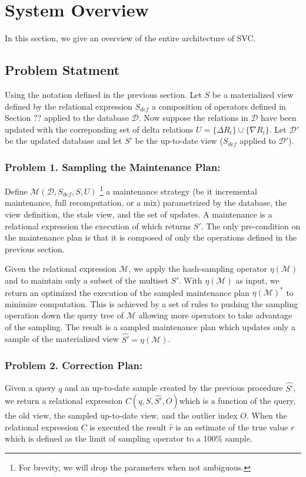 \section{System Overview}\label{sec-arch}
In this section, we give an overview of the entire architecture of SVC.

\subsection{Problem Statment}
Using the notation defined in the previous section. 
Let $S$ be a materialized view defined by the relational expression $S_{def}$ a composition of operators defined in Section ?? applied to the database $\mathcal{D}$.
Now suppose the relations in $\mathcal{D}$ have been updated with the correponding set of delta relations $U = \{\Delta R_i\} \cup \{\nabla R_i\}$.
Let $\mathcal{D}'$ be the updated database and let $S'$ be the up-to-date view ($S_{def}$ applied to $\mathcal{D}'$).

\subsubsection{Problem 1. Sampling the Maintenance Plan: }
Define $\mathcal{M}(\mathcal{D},S_{def},S,U)$ \footnote{For brevity, we will drop the parameters when not ambiguous.} a maintenance strategy (be it incremental maintenance, full recomputation, or a mix) parametrized by the database, the view definition, the stale view, and the set of updates.
A maintenance is a relational expression the execution of which returns $S'$.
The only pre-condition on the maintenance plan is that it is composed of only the operations defined in the previous section. 

Given the relational expression $\mathcal{M}$, we apply the hash-sampling operator $\eta(\mathcal{M})$ and to maintain only a subset of the multiset $S'$.
With $\eta(\mathcal{M})$ as input, we return an optimized the execution of the sampled maintenance plan $\eta(\mathcal{M})^*$ to minimize computation.
This is achieved by a set of rules to pushing the sampling operation down the query tree of $\mathcal{M}$ allowing more operators to take advantage of the sampling. 
The result is a sampled maintenance plan which updates only a sample of the materialized view $\hat{S'} = \eta(\mathcal{M})$.

\subsubsection{Problem 2. Correction Plan: }
Given a query $q$ and an up-to-date sample created by the previous procedure $\hat{S'}$, we return a relational expression $C(q, S, \hat{S'}, O)$\footnotemark[2] which is a function of the query, the old view, the sampled up-to-date view, and the outlier index $O$. When the relational expression $C$ is executed the result $\hat{r}$ is an estimate of the true value $r$ which is defined as the limit of sampling operator to a 100\% sample.

